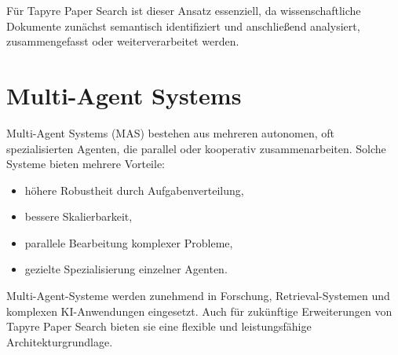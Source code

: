 Für Tapyre Paper Search ist dieser Ansatz essenziell, da wissenschaftliche Dokumente zunächst semantisch identifiziert und anschließend analysiert, zusammengefasst oder weiterverarbeitet werden.

\section{Multi-Agent Systems}

Multi-Agent Systems (MAS) bestehen aus mehreren autonomen, oft spezialisierten Agenten, die parallel oder kooperativ zusammenarbeiten. Solche Systeme bieten mehrere Vorteile:

\begin{itemize}
    \item höhere Robustheit durch Aufgabenverteilung,
    \item bessere Skalierbarkeit,
    \item parallele Bearbeitung komplexer Probleme,
    \item gezielte Spezialisierung einzelner Agenten.
\end{itemize}

Multi-Agent-Systeme werden zunehmend in Forschung, Retrieval-Systemen und komplexen KI-Anwendungen eingesetzt. Auch für zukünftige Erweiterungen von Tapyre Paper Search bieten sie eine flexible und leistungsfähige Architekturgrundlage.

